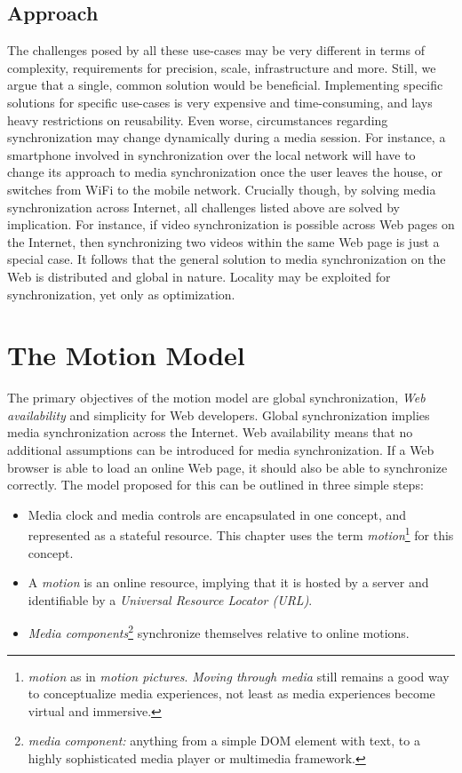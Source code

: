 \documentclass[graybox]{svmult}
\begin{document}
\subsection{Approach}

The challenges posed by all these use-cases may be very different in terms of
complexity, requirements for precision, scale, infrastructure and more. Still,
we argue that a single, common solution would be beneficial. Implementing
specific solutions for specific use-cases is very expensive and time-consuming, 
and lays heavy restrictions on reusability. Even worse,
circumstances regarding synchronization may change dynamically during a media
session. For instance, a smartphone involved in synchronization over the local
network will have to change its approach to media synchronization once the user leaves
the house, or switches from WiFi to the mobile network. Crucially though, by
solving media synchronization across Internet, all challenges listed above are
solved by implication. For instance, if video synchronization is possible
across Web pages on the Internet, then synchronizing two videos within the
same Web page is just a special case. It follows that the general solution to
media synchronization on the Web is distributed and global in nature. Locality
may be exploited for synchronization, yet only as optimization.


\section{The Motion Model}
\label{sec:model}
The primary objectives of the motion model are global synchronization,
\emph{Web availability} and simplicity for Web developers. Global
synchronization implies media synchronization across the Internet. Web
availability means that no additional assumptions can be introduced for media
synchronization. If a Web browser is able to load an online Web page, it
should also be able to synchronize correctly. The model proposed for this can
be outlined in three simple steps:

\begin{itemize}
\item{Media clock and media controls are encapsulated in one concept, and
represented as a stateful resource. This chapter uses the term \emph{motion}\footnote{\emph{motion} as in \emph{motion pictures}. \emph{Moving through media} still remains a good way to conceptualize media experiences, not least as media experiences become virtual and immersive.
} for this
concept.} 
\item{A \emph{motion} is an online resource, implying that it is hosted by a
server and identifiable by a \emph{Universal Resource Locator (URL)}.}
\item{\emph{Media components}\footnote{\emph{media component:} anything from a simple DOM element with text, to a highly sophisticated media player or multimedia framework.
} synchronize themselves relative to online motions.}
\end{itemize}
\end{document}

